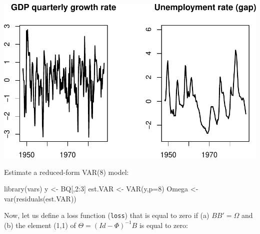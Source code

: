 \documentclass[
  12pt,
]{book}
\newenvironment{Shaded}{\begin{snugshade}}{\end{snugshade}}
\newcommand{\AttributeTok}[1]{\textcolor[rgb]{0.77,0.63,0.00}{#1}}
\newcommand{\DecValTok}[1]{\textcolor[rgb]{0.00,0.00,0.81}{#1}}
\newcommand{\FunctionTok}[1]{\textcolor[rgb]{0.00,0.00,0.00}{#1}}
\newcommand{\NormalTok}[1]{#1}
\newcommand{\OtherTok}[1]{\textcolor[rgb]{0.56,0.35,0.01}{#1}}
\newcommand{\SpecialCharTok}[1]{\textcolor[rgb]{0.00,0.00,0.00}{#1}}
\theoremstyle{definition}
\theoremstyle{definition}
\theoremstyle{definition}
\theoremstyle{definition}
\theoremstyle{remark}
\begin{document}
\includegraphics{IdentifStructShocks_files/figure-latex/BQ1-1.pdf}

Estimate a reduced-form VAR(8) model:

\begin{Shaded}
\begin{Highlighting}[]
\FunctionTok{library}\NormalTok{(vars)}
\NormalTok{y }\OtherTok{\textless{}{-}}\NormalTok{ BQ[,}\DecValTok{2}\SpecialCharTok{:}\DecValTok{3}\NormalTok{]}
\NormalTok{est.VAR }\OtherTok{\textless{}{-}} \FunctionTok{VAR}\NormalTok{(y,}\AttributeTok{p=}\DecValTok{8}\NormalTok{)}
\NormalTok{Omega }\OtherTok{\textless{}{-}} \FunctionTok{var}\NormalTok{(}\FunctionTok{residuals}\NormalTok{(est.VAR))}
\end{Highlighting}
\end{Shaded}

Now, let us define a loss function (\texttt{loss}) that is equal to zero if (a) \(BB'=\Omega\) and (b) the element (1,1) of \(\Theta = (Id - \Phi)^{-1} B\) is equal to zero:
\end{document}
